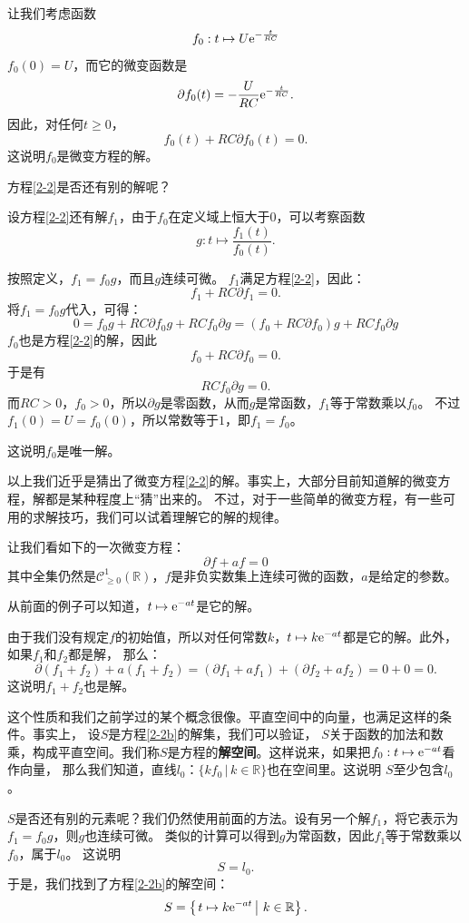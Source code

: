 \documentclass[12pt,UTF8,fontset=none]{ctexbook}
\begin{document}
让我们考虑函数
$$f_0: t\mapsto U\mathrm{e}^{-\frac{t}{RC}}$$
$f_0(0) = U$，而它的微变函数是
$$\partial f_0(t) = -\frac{U}{RC} \mathrm{e}^{-\frac{t}{RC}}. $$
因此，对任何$t\geqslant 0$，
$$ f_0(t) + RC\partial f_0(t) = 0.$$
这说明$f_0$是微变方程的解。

方程\eqref{2-2}是否还有别的解呢？

设方程\eqref{2-2}还有解$f_1$，由于$f_0$在定义域上恒大于$0$，可以考察函数
$$ g : t \mapsto \frac{f_1(t)}{f_0(t)}. $$

按照定义，$f_1 = f_0 g$，而且$g$连续可微。
$f_1$满足方程\eqref{2-2}，因此：
$$ f_1 + RC \partial f_1 = 0.$$
将$f_1 = f_0 g$代入，可得：
$$ 0 = f_0 g + RC \partial f_0 g + RC f_0 \partial g = (f_0 + RC \partial f_0) g + RC f_0 \partial g $$
$f_0$也是方程\eqref{2-2}的解，因此
$$ f_0 + RC\partial f_0 = 0.$$
于是有
$$ RC f_0 \partial g = 0. $$
而$RC>0$，$f_0>0$，所以$\partial g$是零函数，从而$g$是常函数，$f_1$等于常数乘以$f_0$。
不过$f_1(0) = U = f_0(0)$，所以常数等于$1$，即$f_1 = f_0$。

这说明$f_0$是唯一解。

以上我们近乎是猜出了微变方程\eqref{2-2}的解。事实上，大部分目前知道解的微变方程，解都是某种程度上“猜”出来的。
不过，对于一些简单的微变方程，有一些可用的求解技巧，我们可以试着理解它的解的规律。

让我们看如下的一次微变方程：
\begin{equation}
    \partial f + af = 0 \label{2-2b}
\end{equation}
其中全集仍然是$\mathcal{C}^1_{\geqslant 0}(\mathbb{R})$，$f$是非负实数集上连续可微的函数，$a$是给定的参数。

从前面的例子可以知道，$t\mapsto \mathrm{e}^{-at}$是它的解。

由于我们没有规定$f$的初始值，所以对任何常数$k$，$t\mapsto k\mathrm{e}^{-at}$都是它的解。此外，如果$f_1$和$f_2$都是解，
那么：
$$ \partial (f_1 + f_2) + a(f_1 + f_2) = (\partial f_1 + af_1) + (\partial f_2 + af_2) = 0 + 0 = 0. $$
这说明$f_1 + f_2$也是解。

这个性质和我们之前学过的某个概念很像。平直空间中的向量，也满足这样的条件。事实上，
设$S$是方程\eqref{2-2b}的解集，我们可以验证，
$S$关于函数的加法和数乘，构成平直空间。我们称$S$是方程的\textbf{解空间}。这样说来，如果把$f_0:t\mapsto \mathrm{e}^{-at}$看作向量，
那么我们知道，直线$l_0$：$\{kf_0 \, | \, k\in\mathbb{R}\}$也在空间里。这说明
$S$至少包含$l_0$。

$S$是否还有别的元素呢？我们仍然使用前面的方法。设有另一个解$f_1$，将它表示为$f_1 = f_0 g$，则$g$也连续可微。
类似的计算可以得到$g$为常函数，因此$f_1$等于常数乘以$f_0$，属于$l_0$。
这说明
$$S = l_0.$$
于是，我们找到了方程\eqref{2-2b}的解空间：
$$S = \left\{\left.t\mapsto k\mathrm{e}^{-at} \, \right| \, k\in\mathbb{R}\right\}.$$
\end{document}
